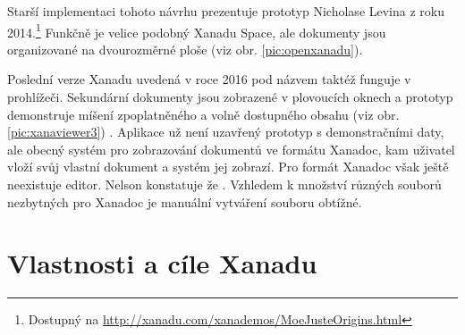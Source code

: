 Starší implementaci tohoto návrhu prezentuje prototyp  Nicholase Levina z roku 2014.\footnote{Dostupný na \url{http://xanadu.com/xanademos/MoeJusteOrigins.html}} Funkčně je velice podobný Xanadu Space, ale dokumenty jsou organizované na dvourozměrné ploše (viz obr. \ref{pic:openxanadu}).


\label{p:impl:xanaviewer}
Poslední verze Xanadu uvedená v roce 2016 pod názvem  taktéž funguje v prohlížeči. Sekundární dokumenty jsou zobrazené v plovoucích oknech a prototyp demonstruje míšení zpoplatněného a volně dostupného obsahu (viz obr. \ref{pic:xanaviewer3}) \autocite{xuDemoPage}. Aplikace už není uzavřený prototyp s demonstračními daty, ale obecný systém pro zobrazování dokumentů ve formátu Xanadoc, kam uživatel vloží svůj vlastní dokument a systém jej zobrazí. Pro formát Xanadoc však ještě neexistuje editor. Nelson konstatuje že . Vzhledem k množství různých souborů nezbytných pro Xanadoc je manuální vytváření souboru obtížné.











\section{Vlastnosti a cíle Xanadu}
\label{sec:xanafeat}

